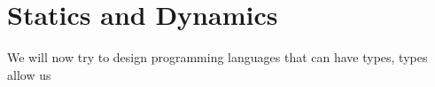 \section{Statics and Dynamics}



We will now try to design programming languages that can have types, types allow us 
